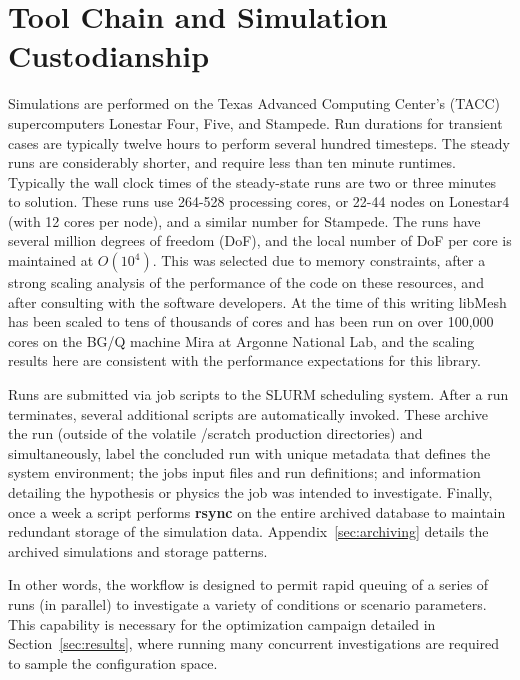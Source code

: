 \section{Tool Chain and Simulation Custodianship}

Simulations are performed on the Texas Advanced Computing Center's 
(TACC) supercomputers Lonestar Four, Five, and Stampede. Run
durations for transient cases are typically twelve hours to perform
several hundred timesteps.  The steady runs are considerably shorter,
and require less than ten minute runtimes. Typically  the wall clock
times of the steady-state runs are two or three minutes to solution. 
These runs use 264-528 processing cores, or 22-44 nodes on Lonestar4
(with 12 cores per node), and a similar number for Stampede. The runs have 
several million degrees of freedom (DoF), and the local number of DoF
per core is maintained at $O(10^4)$. This was selected due to memory
constraints, after a strong scaling analysis of the performance of the
code on these resources, and after consulting with the software developers.  
At the time of this writing libMesh has been scaled to tens of thousands of
cores and has been run on over 100,000 cores on the BG/Q machine Mira at
Argonne National Lab\cite{gaston2013massive}, and the scaling results
here are consistent with the performance expectations for this library.


Runs are submitted via job scripts to the SLURM\cite{yoo2003slurm}
scheduling system. After a run terminates, several additional scripts
are automatically invoked.  
These archive the run (outside of the volatile /scratch 
production directories) and simultaneously, label the concluded run with
unique metadata that defines the system environment; the jobs input
files and run definitions; and information detailing the
hypothesis or physics the job was intended to investigate. Finally, once 
a week a script performs \textbf{rsync} on the entire archived database to
maintain redundant storage of the simulation
data. Appendix~\ref{sec:archiving} details the archived simulations and
storage patterns. 

In other words, the workflow is designed to permit rapid queuing of a
series of runs (in parallel) to investigate a variety of conditions or
scenario parameters. This capability is necessary for the optimization
campaign detailed in Section~\ref{sec:results}, where running many
concurrent investigations are required to sample the configuration
space.  




